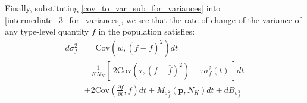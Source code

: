Finally, substituting \eqref{cov_to_var_sub_for_variances} into \eqref{intermediate_3_for_variances}, we see that the rate of change of the variance of any type-level quantity $f$ in the population satisfies:
\begin{equation}
\begin{aligned}
d\sigma^2_{f} &= \textrm{Cov}\left(w,(f - \overline{f})^2\right)dt\\[12pt]
&- \frac{1}{KN_K}\left[ \ 2\textrm{Cov}\left(\tau,(f - \overline{f})^2\right) + \overline{\tau}\sigma^2_{f}(t) \ \right]dt\\[12pt]
& + 2\textrm{Cov}\left(\frac{\partial f}{\partial t},f\right)dt + M_{\sigma^2_f}(\mathbf{p},N_K)dt + dB_{\sigma^2_{f}}
\end{aligned}
\end{equation}